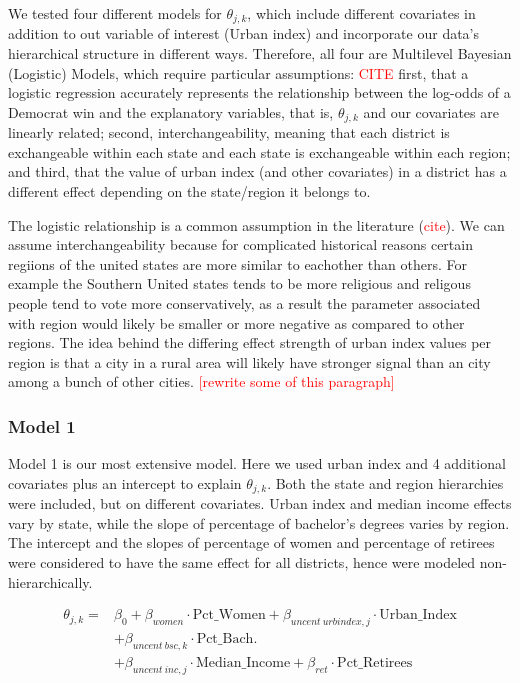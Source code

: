 \documentclass[12pt]{article}
\begin{document}
We tested four different models for $\theta_{j,k}$, which include different covariates in addition to out variable of interest (Urban index) and incorporate our data's hierarchical structure in different ways. Therefore, all four are Multilevel Bayesian (Logistic) Models, which require particular assumptions: \textcolor{red}{CITE} 
first, that a logistic regression accurately represents the relationship between the log-odds of a Democrat win and the explanatory variables, that is, $\theta_{j,k}$ and our covariates are linearly related; second, interchangeability, meaning that each district is exchangeable within each state and each state is exchangeable within each region; and third, that the value of urban index (and other covariates) in a district has a different effect depending on the state/region it belongs to.


The logistic relationship is a common assumption in the literature (\textcolor{red}{cite}).
We can assume interchangeability because for complicated historical reasons certain regiions of the united states are more similar to eachother than others. For example the Southern United states tends to be more religious and religous people tend to vote more conservatively, as a result the parameter associated with region would likely be smaller or more negative as compared to other regions. 
The idea behind the differing effect strength of urban index values per region is that a city in a rural area will likely have stronger signal than an city among a bunch of other cities. \textcolor{red}{[rewrite some of this paragraph]}



\subsubsection*{Model 1}

Model 1 is our most extensive model. Here we used urban index and 4 additional covariates plus an intercept to explain $\theta_{j,k}$.
Both the state and region hierarchies were included, but on different covariates. Urban index and median income effects vary by state, while the slope of percentage of bachelor's degrees varies by region. The intercept and the slopes of percentage of women and percentage of retirees were considered to have the same effect for all districts, hence were modeled non-hierarchically.



\begin{equation} \label{eq:mod1_uncentered}
	\begin{aligned}
		\theta_{j,k} = & \beta_0 + \beta_{women} \cdot \text{Pct\_Women} + \beta_{uncent \: urbindex, j} \cdot \text{Urban\_Index} \\
		               & + \beta_{uncent \: bsc,k} \cdot \text{Pct\_Bach.} \\
		               & + \beta_{uncent \: inc,j} \cdot \text{Median\_Income} + \beta_{ret} \cdot \text{Pct\_Retirees}
	\end{aligned}
\end{equation}
\end{document}
